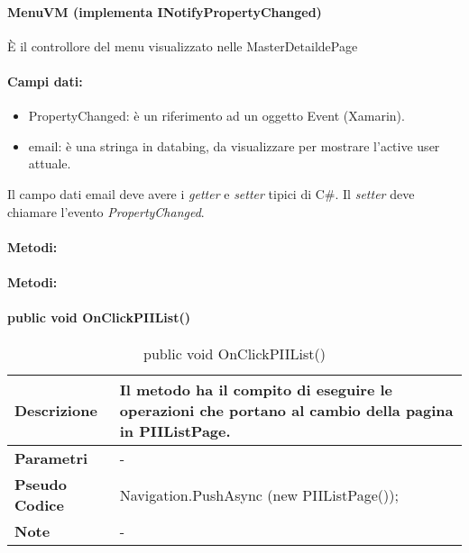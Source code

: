 \paragraph{MenuVM (implementa INotifyPropertyChanged)}
È il controllore del menu visualizzato nelle MasterDetaildePage
\paragraph{Campi dati:}
\begin{itemize}
    \item PropertyChanged: è un riferimento ad un oggetto Event (Xamarin).
    \item email: è una stringa in databing, da visualizzare per mostrare l’active user attuale. 
\end{itemize}
Il campo dati email deve avere i \emph{getter} e \emph{setter} tipici di C\#. Il \emph{setter} deve chiamare l’evento \emph{PropertyChanged}.

\paragraph{Metodi:}

\paragraph{Metodi:}
\paragraph{public void OnClickPIIList()}
\begin{center}
    \begin{longtable}{|p{3cm}|p{9cm}|}%
    \caption{public void OnClickPIIList()}
    \endfirsthead
    \endhead
    \hline
    \textbf{Descrizione} & Il metodo ha il compito di eseguire le operazioni che portano al cambio della pagina in PIIListPage.\\
    \hline
    \textbf{Parametri} &      
    -
    \\
    \hline
    \textbf{Pseudo Codice} & 
    Navigation.PushAsync (new PIIListPage());
    \\
    \hline
    \textbf{Note} & 
    -
    \\
    \hline
    \end{longtable}
\end{center}




